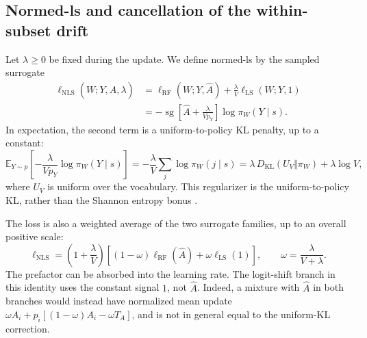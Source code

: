 \subsection{Normed-ls and cancellation of the within-subset drift}
\label{app:dynamics-normed-ls}

Let $\lambda\ge0$ be fixed during the update. We define normed-ls by
the sampled surrogate
\begin{align}
 \ell_{\mathrm{NLS}}(W;Y,\widehat A,\lambda)
 &=\ell_{\mathrm{RF}}(W;Y,\widehat A)
       +\frac{\lambda}{V}\ell_{\mathrm{LS}}(W;Y,1) \nonumber\\
 &=-\operatorname{sg}\left[\widehat A+\frac{\lambda}{Vp_Y}\right]
                  \log\pi_W(Y\mid s).
 \label{eq:dyn-nls-loss}
\end{align}
In expectation, the second term is a uniform-to-policy KL penalty,
up to a constant:
\begin{equation}
 \mathbb E_{Y\sim p}\left[
       -\frac{\lambda}{Vp_Y}\log\pi_W(Y\mid s)\right]
 =-\frac{\lambda}{V}\sum_j\log\pi_W(j\mid s)
 =\lambda\,D_{\mathrm{KL}}(U_V\Vert\pi_W)+\lambda\log V,
 \label{eq:dyn-barrier-identity}
\end{equation}
where $U_V$ is uniform over the vocabulary. This regularizer is the
uniform-to-policy KL, rather than the Shannon entropy bonus
\citep{agarwal2021policygradient}.

The loss is also a weighted average of the two surrogate families, up to
an overall positive scale:
\begin{equation}
 \ell_{\mathrm{NLS}}
 =\left(1+\frac{\lambda}{V}\right)
   \left[(1-\omega)\ell_{\mathrm{RF}}(\widehat A)
               +\omega\ell_{\mathrm{LS}}(1)\right],
 \qquad \omega=\frac{\lambda}{V+\lambda}.
 \label{eq:dyn-nls-mixture}
\end{equation}
The prefactor can be absorbed into the learning rate. The logit-shift
branch in this identity uses the constant signal $1$, not
$\widehat A$. Indeed, a mixture with $\widehat A$ in both branches
would instead have normalized mean update
$\omega A_i+p_i[(1-\omega)A_i-\omega T_A]$, and is not in general
equal to the uniform-KL correction.

